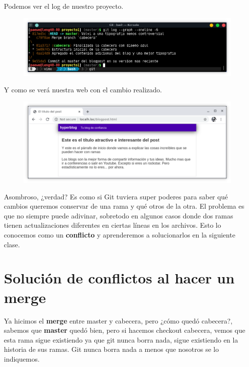 \documentclass{article}
\begin{document}
Podemos ver el log de nuestro proyecto.

\begin{figure}[h!]
  \centering
  \includegraphics[scale=0.75]{./Pictures/165_nuevo_log.png}
\end{figure}

Y como se verá nuestra web con el cambio realizado.

\begin{figure}[h!]
  \centering
  \includegraphics[scale=0.75]{./Pictures/166_nueva_web.png}
\end{figure}

Asombroso, ¿verdad? Es como si Git tuviera super poderes para saber qué cambios
queremos conservar de una rama y qué otros de la otra. El problema es que no
siempre puede adivinar, sobretodo en algunos casos donde dos ramas tienen
actualizaciones diferentes en ciertas líneas en los archivos. Esto lo conocemos
como un \textbf{conflicto} y aprenderemos a solucionarlos en la siguiente
clase.\\

\newpage

\section{Solución de conflictos al hacer un merge}%
Ya hicimos el \textbf{merge} entre master y cabecera, pero ¿cómo quedó
cabecera?, sabemos que \textbf{master} quedó bien, pero si hacemos checkout
cabecera, vemos que esta rama sigue existiendo ya que git nunca borra nada,
sigue existiendo en la historia de sus ramas. Git nunca borra nada a menos que
nosotros se lo indiquemos.
\end{document}
